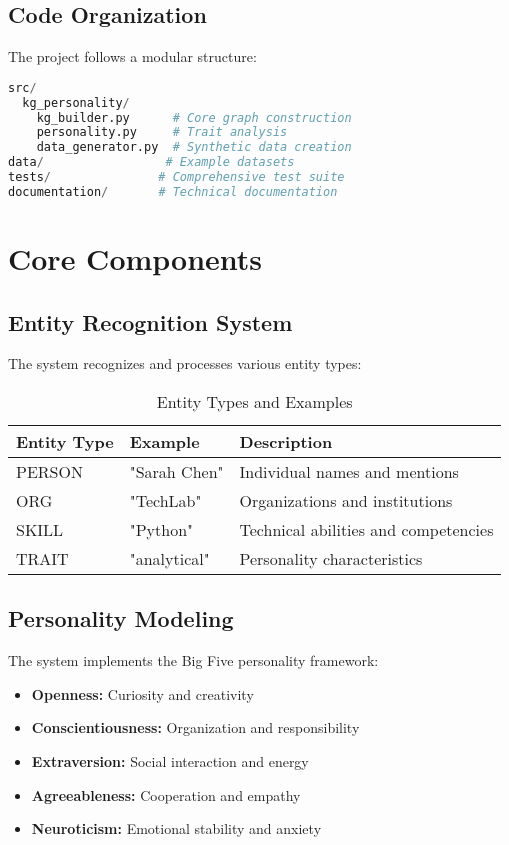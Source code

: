 \documentclass[11pt]{article}
\begin{document}
\subsection{Code Organization}
The project follows a modular structure:

\begin{lstlisting}[language=Python, caption=Project Structure]
src/
  kg_personality/
    kg_builder.py      # Core graph construction
    personality.py     # Trait analysis
    data_generator.py  # Synthetic data creation
data/                 # Example datasets
tests/               # Comprehensive test suite
documentation/       # Technical documentation
\end{lstlisting}

\section{Core Components}

\subsection{Entity Recognition System}
The system recognizes and processes various entity types:

\begin{table}[H]
\centering
\begin{tabular}{@{}llp{8cm}@{}}
\toprule
\textbf{Entity Type} & \textbf{Example} & \textbf{Description} \\
\midrule
PERSON & "Sarah Chen" & Individual names and mentions \\
ORG & "TechLab" & Organizations and institutions \\
SKILL & "Python" & Technical abilities and competencies \\
TRAIT & "analytical" & Personality characteristics \\
\bottomrule
\end{tabular}
\caption{Entity Types and Examples}
\label{tab:entities}
\end{table}

\subsection{Personality Modeling}
The system implements the Big Five personality framework:

\begin{itemize}[label=$\bullet$]
    \item \textbf{Openness:} Curiosity and creativity
    \item \textbf{Conscientiousness:} Organization and responsibility
    \item \textbf{Extraversion:} Social interaction and energy
    \item \textbf{Agreeableness:} Cooperation and empathy
    \item \textbf{Neuroticism:} Emotional stability and anxiety
\end{itemize}
\end{document}
